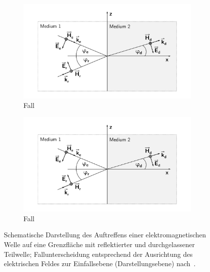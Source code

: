 \begin{figure}
    \centering
    \begin{subfigure}[b]{0.45\textwidth}
        \includegraphics[page = 1, width=\textwidth, trim = 3.5cm 1cm 3.5cm 1cm, clip]{Abbildungen/Kapitel2/Wellenreflektion.pdf}
        \caption{Fall \label{subfig:2_Wellenreflektion_Fall1}}
    \end{subfigure}
    \hspace{1cm}
    \begin{subfigure}[b]{0.45\textwidth}
        \includegraphics[page = 2, width=\textwidth, trim = 3.5cm 1cm 3.5cm 1cm, clip]{Abbildungen/Kapitel2/Wellenreflektion.pdf}
        \caption{Fall \label{subfig:2_Wellenreflektion_Fall2}}
    \end{subfigure}
    \caption[Schematische Darstellung des Auftreffens einer elektromagnetischen Welle auf eine Grenzfläche mit reflektierter und durchgelassener Teilwelle]{Schematische Darstellung des Auftreffens einer elektromagnetischen Welle auf eine Grenzfläche mit reflektierter und durchgelassener Teilwelle; Fallunterscheidung entsprechend der Ausrichtung des elektrischen Feldes zur Einfallsebene (Darstellungsebene) nach~\cite{EM_Schirmung}.}
    \label{fig:2_Wellenreflektion}
\end{figure}

